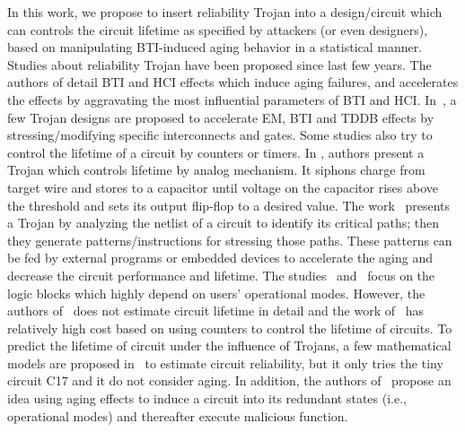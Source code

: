 In this work, we propose to insert reliability Trojan into a design/circuit which can controls the circuit lifetime as specified by attackers (or even designers), based on manipulating BTI-induced aging behavior in a statistical manner. Studies about reliability Trojan have been proposed since last few years. The authors of \cite{shiyanovskii2010process} detail BTI and HCI effects which induce aging failures, and accelerates the effects by aggravating the most influential parameters of BTI and HCI. In~\cite{sreedhar2012reliability}, a few Trojan designs are proposed to accelerate EM, BTI and TDDB effects by stressing/modifying specific interconnects and gates. Some studies also try to control the lifetime of a circuit by counters or timers. In \cite{yang2016a2}, authors present a Trojan which controls lifetime by analog mechanism. It siphons charge from target wire and stores to a capacitor until voltage on the capacitor rises above the threshold and sets its output flip-flop to a desired value. The work~\cite{karimi2015magic} presents a Trojan by analyzing the netlist of a circuit to identify its critical paths; then they generate patterns/instructions for stressing those paths. These patterns can be fed by external programs or embedded devices to accelerate the aging and decrease the circuit performance and lifetime. The studies~\cite{yang2016a2} and~\cite{karimi2015magic} focus on the logic blocks which highly depend on users' operational modes. However, the authors of~\cite{shiyanovskii2010process} does not estimate circuit lifetime in detail and the work of~\cite{sreedhar2012reliability} has relatively high cost based on using counters to control the lifetime of circuits. To predict the lifetime of circuit under the influence of Trojans, a few mathematical models are proposed in~\cite{burman2012effect} to estimate circuit reliability, but it only tries the tiny circuit C17 and it do not consider aging. In addition, the authors of~\cite{wei2013undetectable} propose an idea using aging effects to induce a circuit into its redundant states (i.e., operational modes) and thereafter execute malicious function.

